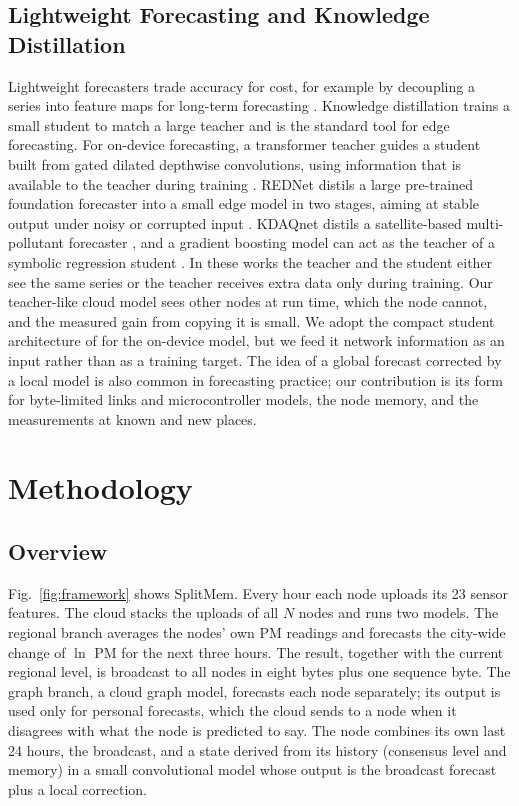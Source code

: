 \documentclass[journal]{IEEEtran}
\begin{document}
\subsection{Lightweight Forecasting and Knowledge Distillation}
Lightweight forecasters trade accuracy for cost, for example by decoupling a series into feature maps for long-term forecasting \cite{tang2025tsm}. Knowledge distillation \cite{hinton2015distill} trains a small student to match a large teacher and is the standard tool for edge forecasting. For on-device forecasting, a transformer teacher guides a student built from gated dilated depthwise convolutions, using information that is available to the teacher during training \cite{na2026privileged}. REDNet distils a large pre-trained foundation forecaster into a small edge model in two stages, aiming at stable output under noisy or corrupted input \cite{fu2026rednet}. KDAQnet distils a satellite-based multi-pollutant forecaster \cite{kumar2026kdaqnet}, and a gradient boosting model can act as the teacher of a symbolic regression student \cite{shmuel2026forest}. In these works the teacher and the student either see the same series or the teacher receives extra data only during training. Our teacher-like cloud model sees other nodes at run time, which the node cannot, and the measured gain from copying it is small. We adopt the compact student architecture of \cite{na2026privileged} for the on-device model, but we feed it network information as an input rather than as a training target. The idea of a global forecast corrected by a local model is also common in forecasting practice; our contribution is its form for byte-limited links and microcontroller models, the node memory, and the measurements at known and new places.

\section{Methodology}
\label{sec:method}
\subsection{Overview}
Fig.~\ref{fig:framework} shows SplitMem. Every hour each node uploads its 23 sensor features. The cloud stacks the uploads of all $N$ nodes and runs two models. The regional branch averages the nodes' own PM readings and forecasts the city-wide change of $\ln$ PM for the next three hours. The result, together with the current regional level, is broadcast to all nodes in eight bytes plus one sequence byte. The graph branch, a cloud graph model, forecasts each node separately; its output is used only for personal forecasts, which the cloud sends to a node when it disagrees with what the node is predicted to say. The node combines its own last 24 hours, the broadcast, and a state derived from its history (consensus level and memory) in a small convolutional model whose output is the broadcast forecast plus a local correction.
\end{document}
